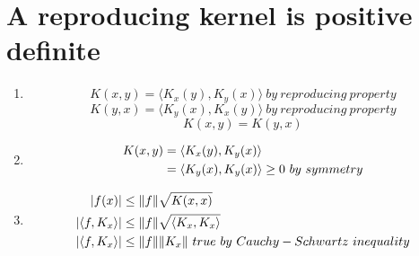 \documentclass{article}
\begin{document}
\section{A reproducing kernel is positive definite}
\begin{enumerate}
    \item 
        \[K(x,y) = \langle K_x(y), K_y(x) \rangle\ by\ reproducing\ property\]
        \[K(y,x) = \langle K_y(x), K_x(y) \rangle\ by\ reproducing\ property\] 
        \[K(x,y) = K(y,x)\]
    \item
        \begin{equation}
        \begin{aligned}
        K(x,y) & = \langle K_x(y), K_y(x) \rangle\\
        & =  \langle K_y(x), K_y(x) \rangle \ge 0\ by\ symmetry\notag \\
        \end{aligned}
        \end{equation}
    \item 
        \begin{equation}
        \begin{aligned}
        |f(x)| & \le \|f\|\sqrt{K(x,x)}\\
        |\langle f, K_x \rangle|& \le  \|f\| \sqrt{\langle K_x, K_x \rangle} \notag \\
        |\langle f, K_x \rangle|& \le  \|f\| \| K_x \|\ true\ by\ Cauchy-Schwartz\ inequality \notag \\
        \end{aligned}
        \end{equation}

\end{enumerate}
\end{document}
